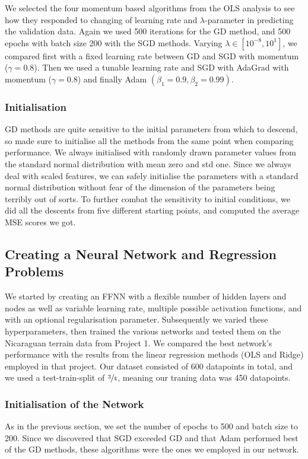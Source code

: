         We selected the four momentum based algorithms from the OLS analysis to see how they responded to changing of learning rate and $\lambda$-parameter in predicting the validation data. Again we used 500 iterations for the GD method, and 500 epochs with batch size 200 with the SGD methods. Varying $\lambda \in [10^{-8}, 10^1]$, we compared first with a fixed learning rate between GD and SGD with momentum ($\gamma=0.8$). Then we used a tunable learning rate and SGD with AdaGrad with momentum ($\gamma=0.8$) and finally Adam $(\beta_1=0.9, \beta_2=0.99)$.

    \subsubsection{Initialisation}
        GD methods are quite sensitive to the initial parameters from which to descend, so made sure to initialise all the methods from the same point when comparing performance. We always initialised with randomly drawn parameter values from the standard normal distribution with mean zero and std one. Since we always deal with scaled features, we can safely initialise the parameters with a standard normal distribution without fear of the dimension of the parameters being terribly out of sorts. To further combat the sensitivity to initial conditions, we did all the descents from five different starting points, and computed the average MSE scores we got.

\subsection{Creating a Neural Network and Regression Problems}
    We started by creating an FFNN with a flexible number of hidden layers and nodes as well as variable learning rate, multiple possible activation functions, and with an optional regularisation parameter. Subsequently we varied these hyperparameters, then trained the various networks and tested them on the Nicaraguan terrain data from Project 1. We compared the best network's performance with the results from the linear regression methods (OLS and Ridge) employed in that project. Our dataset consisted of 600 datapoints in total, and we used a test-train-split of $\sfrac{3}{4}$, meaning our traning data was 450 datapoints. 
    
    \subsubsection{Initialisation of the Network}
        As in the previous section, we set the number of epochs to 500 and batch size to 200. Since we discovered that SGD exceeded GD and that Adam performed best of the GD methods, these algorithms were the ones we employed in our network.    

